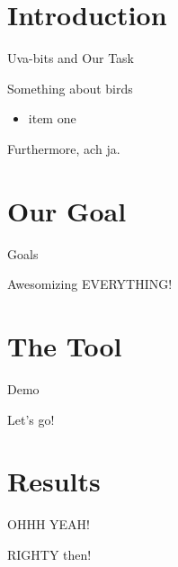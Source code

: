 \documentclass{beamer}
\title{\projectName}
\subtitle{\projectAbbreviation}
\author{Jesse Eisses, Sosha Happel, Maarten Inja and Maarten de Waard}
\institute{UvA}
\newcommand{\slide}[2]
{
\begin{frame}
\begin{block}{#1} 

#2

\end{block} \end{frame}
}
\begin{document}
\begin{frame}
\titlepage
\end{frame}



\section{Introduction}
\slide{Uva-bits and Our Task}
{
Something about birds
\begin{itemize}
	\item item one
\end{itemize}
Furthermore, ach ja.
}

\section{Our Goal}
\slide{Goals}
{
    Awesomizing EVERYTHING!
}

\section{The Tool}
\slide{Demo}
{
    Let's go!
}


\section{Results}
\slide{OHHH YEAH!}
{
    RIGHTY then!
}
\end{document}
